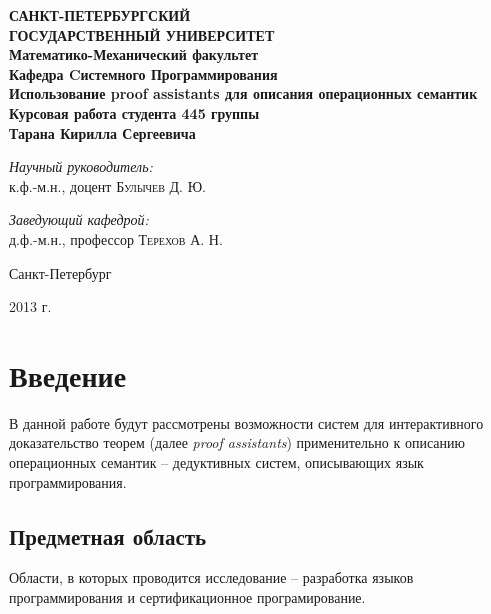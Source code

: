 \documentclass[aps,12pt,final,oneside,onecolumn,musixtex,superscriptaddress,centertags]{article}
\begin{document}
\sloppy

  \begin{titlepage} 
     \begin{center}
        \textbf{\Large САНКТ-ПЕТЕРБУРГСКИЙ \\ ГОСУДАРСТВЕННЫЙ УНИВЕРСИТЕТ} \\[1.0cm]
        \textbf{\large Математико-Механический факультет} \\[0.2cm]
        \textbf{\large Кафедра Cистемного Программирования}\\[3.5cm]

        \textbf{\LARGE Использование proof assistants для описания операционных семантик}\\[1.0cm]
        \textbf{\Large Курсовая работа студента 445 группы} \\[0.2cm]
        \textbf{\Large Тарана Кирилла Сергеевича} \\[3.5cm]

        \begin{flushright} \large \emph{Научный руководитель:} \\ к.ф.-м.н., доцент    \textsc{Булычев Д. Ю.} \end{flushright}
        \begin{flushright} \large \emph{Заведующий кафедрой:}  \\ д.ф.-м.н., профессор \textsc{Терехов А. Н.} \end{flushright}
        \vfill 

        {\large {Санкт-Петербург}} \par
        {\large {2013 г.}}
     \end{center} 
  \end{titlepage}

  \tableofcontents
  \newpage

  \section{Введение}
     В данной работе будут рассмотрены возможности систем для интерактивного доказательство теорем (далее \emph{proof assistants}) применительно к описанию операционных семантик -- дедуктивных систем, описывающих язык программирования.

  \subsection{Предметная область}
     Области, в которых проводится исследование -- разработка языков программирования и сертификационное програмирование.
\end{document}
